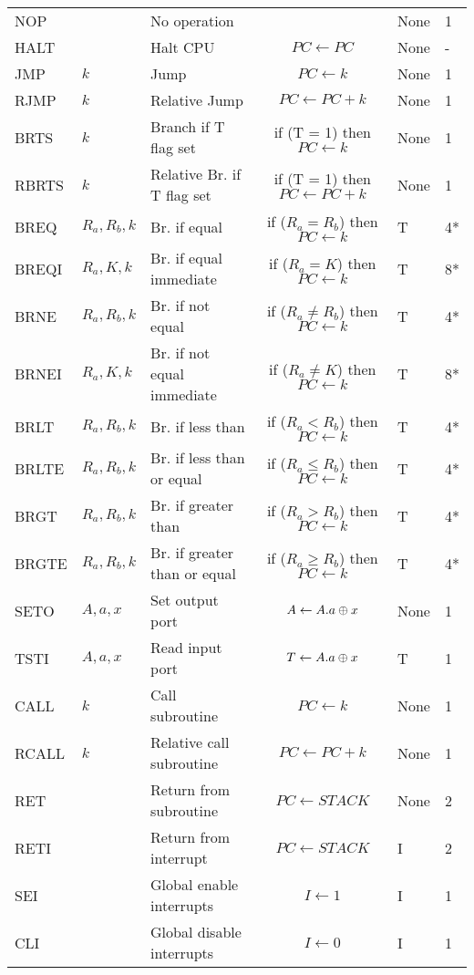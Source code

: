 \documentclass[12pt,twoside]{report}
\begin{document}
{\begin{longtable}{ | l | l | l | c | l | l | }
\endlastfoot
NOP & & No operation & & None & 1 \\
HALT & & Halt CPU & $PC \leftarrow PC$ & None & - \\
JMP & $k$ & Jump & $PC \leftarrow k$ & None & 1 \\
RJMP & $k$ & Relative Jump & $PC \leftarrow PC + k$  & None & 1 \\
BRTS & $k$ & Branch if T flag set & if (T = 1) then $PC \leftarrow k$  & None & 1 \\
RBRTS & $k$ & Relative Br. if T flag set & if (T = 1) then $PC \leftarrow PC + k$  & None & 1 \\
BREQ & $R_a, R_b, k$ & Br. if equal & if ($R_a = R_b$) then $PC \leftarrow k$ & T & 4* \\
BREQI & $R_a, K, k$ & Br. if equal immediate & if ($R_a = K$) then $PC \leftarrow k$ & T & 8* \\
BRNE & $R_a, R_b, k$ & Br. if not equal & if ($R_a \neq R_b$) then $PC \leftarrow k$ & T & 4* \\
BRNEI & $R_a, K, k$ & Br. if not equal immediate & if ($R_a \neq K$) then $PC \leftarrow k$ & T & 8* \\
BRLT & $R_a, R_b, k$ & Br. if less than & if ($R_a < R_b$) then $PC \leftarrow k$ & T & 4* \\
BRLTE & $R_a, R_b, k$ & Br. if less than or equal & if ($R_a \le R_b$) then $PC \leftarrow k$ & T & 4* \\
BRGT & $R_a, R_b, k$ & Br. if greater than & if ($R_a > R_b$) then $PC \leftarrow k$ & T & 4* \\
BRGTE & $R_a, R_b, k$ & Br. if greater than or equal & if ($R_a \ge R_b$) then $PC \leftarrow k$ & T & 4* \\
SETO & $A, a, x$ & Set output port & $A \leftarrow A . a \mathbin{\oplus} x$  & None & 1 \\
TSTI & $A, a, x$ & Read input port & $T \leftarrow A . a \mathbin{\oplus} x$  & T & 1 \\
CALL & $k$ & Call subroutine & $PC \leftarrow k$ & None & 1 \\
RCALL & $k$ & Relative call subroutine & $PC \leftarrow PC + k$ & None & 1 \\
RET & & Return from subroutine & $PC \leftarrow STACK$ & None & 2 \\
RETI & & Return from interrupt & $PC \leftarrow STACK$ & I & 2 \\
SEI & & Global enable interrupts & $I \leftarrow 1$ & I & 1 \\
CLI & & Global disable interrupts & $I \leftarrow 0$ & I & 1 \\

\end{longtable}}
\end{document}

